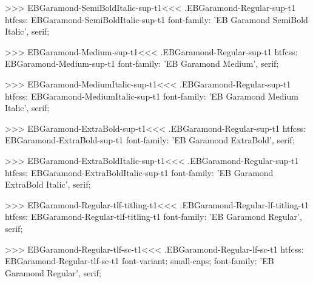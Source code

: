 {{{{{{{>>>
\<EBGaramond-SemiBoldItalic-sup-t1\><<<
.EBGaramond-Regular-sup-t1
htfcss:  EBGaramond-SemiBoldItalic-sup-t1  font-family: 'EB Garamond SemiBold Italic', serif;

>>>
\<EBGaramond-Medium-sup-t1\><<<
.EBGaramond-Regular-sup-t1
htfcss:  EBGaramond-Medium-sup-t1  font-family: 'EB Garamond Medium', serif;

>>>
\<EBGaramond-MediumItalic-sup-t1\><<<
.EBGaramond-Regular-sup-t1
htfcss:  EBGaramond-MediumItalic-sup-t1  font-family: 'EB Garamond Medium Italic', serif;

>>>
\<EBGaramond-ExtraBold-sup-t1\><<<
.EBGaramond-Regular-sup-t1
htfcss:  EBGaramond-ExtraBold-sup-t1  font-family: 'EB Garamond ExtraBold', serif;

>>>
\<EBGaramond-ExtraBoldItalic-sup-t1\><<<
.EBGaramond-Regular-sup-t1
htfcss:  EBGaramond-ExtraBoldItalic-sup-t1  font-family: 'EB Garamond ExtraBold Italic', serif;

>>>
\<EBGaramond-Regular-tlf-titling-t1\><<<
.EBGaramond-Regular-lf-titling-t1
htfcss:  EBGaramond-Regular-tlf-titling-t1  font-family: 'EB Garamond Regular', serif;

>>>
\<EBGaramond-Regular-tlf-sc-t1\><<<
.EBGaramond-Regular-lf-sc-t1
htfcss:  EBGaramond-Regular-tlf-sc-t1  font-variant: small-caps; font-family: 'EB Garamond Regular', serif;

}}}}}}}
